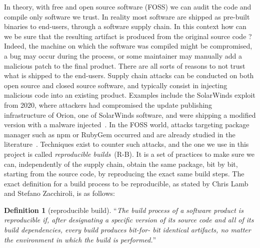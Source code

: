 \documentclass[a4paper,11pt,oneside]{report}
\theoremstyle{definition}
\newtheorem{definition}{Definition}[section]
\newcommand{\rb}{reproducible builds\xspace}
\begin{document}
In theory, with free and open source software (FOSS) we can audit the code and
compile only software we trust. In reality most software are shipped as
pre-built binaries to end-users, through a software supply chain. In this
context how can we be sure that the resulting artifact is produced from the
original source code ? Indeed, the machine on which the software was compiled
might be compromised, a bug may occur during the process, or some maintainer
may manually add a malicious patch to the final product. There are all sorts of
reasons to not trust what is shipped to the end-users. Supply chain attacks can
be conducted on both open source and closed source software, and typically
consist in injecting malicious code into an existing product. Examples include
the SolarWinds exploit from 2020, where attackers had compromised the update
publishing infrastructure of Orion, one of SolarWinds software, and were
shipping a modified version with a malware injected~\cite{enwiki:solarwinds}.
In the FOSS world, attacks targeting package manager such as npm or RubyGem
occurred and are already studied in the
literature~\cite{10.1007/978-3-030-52683-2_2}.
Techniques exist to counter such attacks, and the one we use in this project is
called \emph{\rb}~(R-B). It is a set of practices to make sure we can,
independently of the supply chain, obtain the same package, bit by bit,
starting from the source code, by reproducing the exact same build steps. The
exact definition for a build process to be reproducible, as stated by Chris
Lamb and Stefano Zacchiroli, is as follows:

\begin{definition}[reproducible build]
\label{def:reprobuild}
``\emph{The build process of a software
product is reproducible if, after designating a
specific version of its source code and all of its
build dependencies, every build produces bit-for-
bit identical artifacts, no matter the environment
in which the build is performed.}''~\cite{DBLP:journals/corr/abs-2104-06020}
\end{definition}
\end{document}
